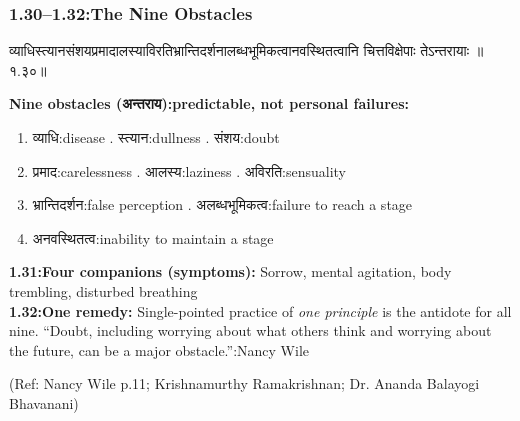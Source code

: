 \begin{frame}[fragile]\frametitle{1.30–1.32:The Nine Obstacles}

\begin{sanskrit}
व्याधिस्त्यानसंशयप्रमादालस्याविरतिभ्रान्तिदर्शनालब्धभूमिकत्वानवस्थितत्वानि चित्तविक्षेपाः तेऽन्तरायाः ॥१.३०॥
\end{sanskrit}

\textbf{Nine obstacles (अन्तराय):predictable, not personal failures:}

\begin{enumerate}
\item व्याधि:disease . स्त्यान:dullness . संशय:doubt
\item प्रमाद:carelessness . आलस्य:laziness . अविरति:sensuality
\item भ्रान्तिदर्शन:false perception . अलब्धभूमिकत्व:failure to reach a stage
\item अनवस्थितत्व:inability to maintain a stage
\end{enumerate}

\textbf{1.31:Four companions (symptoms):} Sorrow, mental agitation, body trembling, disturbed breathing\\
\textbf{1.32:One remedy:} Single-pointed practice of \emph{one principle} is the antidote for all nine. ``Doubt, including worrying about what others think and worrying about the future, can be a major obstacle.'':Nancy Wile

\tiny{(Ref: Nancy Wile p.11; Krishnamurthy Ramakrishnan; Dr. Ananda Balayogi Bhavanani)}

\end{frame}

